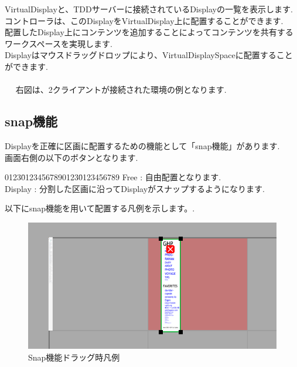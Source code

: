 \documentclass[a4paper,10pt,oneside]{jsbook}
\begin{document}
VirtualDisplayと、TDDサーバーに接続されているDisplayの一覧を表示します.\\
コントローラは、このDisplayをVirtualDisplay上に配置することができます.\\

配置したDisplay上にコンテンツを追加することによってコンテンツを共有するワークスペースを実現します.\\
Displayはマウスドラッグドロップにより、VirtualDisplaySpaceに配置することができます.\\
\\　
右図は、2クライアントが接続された環境の例となります.


\clearpage 



\subsection{snap機能}
Displayを正確に区画に配置するための機能として「snap機能」があります.\\
画面右側の以下のボタンとなります.\\

\begin{tabbing}
0123\=01234567890123\=0123456789\kill
\>Free    \> : 自由配置となります.\\
\>Display \> : 分割した区画に沿ってDisplayがスナップするようになります.
\end{tabbing}

以下にsnap機能を用いて配置する凡例を示します。.\\

\begin{figure}[htbp]
	\begin{center}
		\includegraphics[width=15.5cm]{image/Snap1.png}
	\end{center}
	\caption{Snap機能ドラッグ時凡例}
	\label{fig:snapdrag}
\end{figure}
\end{document}
